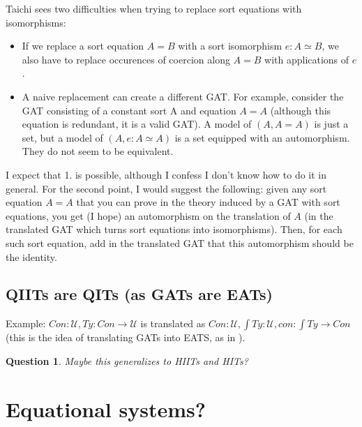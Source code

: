 \documentclass{article}
\newcommand{\U}{\mathcal{U}}
\newtheorem{question}[theorem]{Question}
\begin{document}
Taichi sees two difficulties when trying to replace sort
equations with isomorphisms:
\begin{itemize}
\item If we replace a sort equation $A = B$ with a sort isomorphism $e : A \simeq B$, we also have to replace occurences of coercion along $A = B$ with
  applications of $e$.
  \item A naive replacement can create a different GAT. For
  example, consider the GAT consisting of a constant sort A and equation $A = A$
  (although this equation is redundant, it is a valid GAT). A model of
  $(A, A = A)$ is just a set, but a model of $(A, e : A \simeq A)$ is a set equipped with an
  automorphism. They do not seem to be equivalent.
\end{itemize}
I expect that 1. is possible, although I confess I don't know how to
do it in general.
For the second point, I would suggest the
following: given any sort equation $A = A$ that you can prove in the
theory induced by a GAT with sort equations, you get (I hope) an
automorphism on the translation of $A$ (in the translated GAT which
turns sort equations into isomorphisms). Then,  for each such sort
equation, add in the translated GAT that this automorphism should be
the identity.
\subsection{QIITs are QITs (as GATs are EATs)}
Example:
$Con:\U, Ty:Con\to\U$ is translated as $ Con:\U,\int Ty : \U, con : \int Ty\to
Con$ (this is the idea of translating GATs into EATS, as in \cite{CARTMELL}).
\begin{question}
  Maybe this generalizes to HIITs and HITs?
\end{question}
\section{Equational systems?}
\appendix
\end{document}
